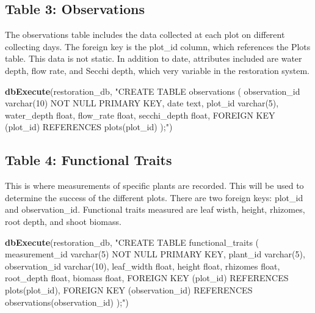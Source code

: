 \documentclass[
]{book}
\newenvironment{Shaded}{\begin{snugshade}}{\end{snugshade}}
\newcommand{\KeywordTok}[1]{\textcolor[rgb]{0.13,0.29,0.53}{\textbf{#1}}}
\newcommand{\NormalTok}[1]{#1}
\newcommand{\StringTok}[1]{\textcolor[rgb]{0.31,0.60,0.02}{#1}}
\begin{document}
\hypertarget{table-3-observations}{%
\subsection{Table 3: Observations}\label{table-3-observations}}

The observations table includes the data collected at each plot on different collecting days. The foreign key is the plot\_id column, which references the Plots table. This data is not static. In addition to date, attributes included are water depth, flow rate, and Secchi depth, which very variable in the restoration system.

\begin{Shaded}
\begin{Highlighting}[]
\KeywordTok{dbExecute}\NormalTok{(restoration_db, }\StringTok{"CREATE TABLE observations (}
\StringTok{          observation_id varchar(10) NOT NULL PRIMARY KEY,}
\StringTok{          date text,}
\StringTok{          plot_id varchar(5), }
\StringTok{          water_depth float, }
\StringTok{          flow_rate float,}
\StringTok{          secchi_depth float,}
\StringTok{          FOREIGN KEY (plot_id) REFERENCES plots(plot_id)}
\StringTok{          );"}\NormalTok{)}
\end{Highlighting}
\end{Shaded}

\hypertarget{table-4-functional-traits}{%
\subsection{Table 4: Functional Traits}\label{table-4-functional-traits}}

This is where measurements of specific plants are recorded. This will be used to determine the success of the different plots. There are two foreign keys: plot\_id and observation\_id. Functional traits measured are leaf wisth, height, rhizomes, root depth, and shoot biomass.

\begin{Shaded}
\begin{Highlighting}[]
\KeywordTok{dbExecute}\NormalTok{(restoration_db, }\StringTok{"CREATE TABLE functional_traits (}
\StringTok{          measurement_id varchar(5) NOT NULL PRIMARY KEY,}
\StringTok{          plant_id varchar(5),}
\StringTok{          observation_id varchar(10), }
\StringTok{          leaf_width float, }
\StringTok{          height float, }
\StringTok{          rhizomes float, }
\StringTok{          root_depth float,}
\StringTok{          biomass float, }
\StringTok{          FOREIGN KEY (plot_id) REFERENCES plots(plot_id),}
\StringTok{          FOREIGN KEY (observation_id) REFERENCES observations(observation_id)}
\StringTok{          );"}\NormalTok{)}
\end{Highlighting}
\end{Shaded}
\end{document}
